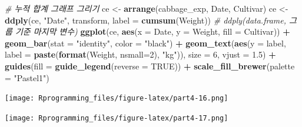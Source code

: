 \documentclass[10pt,]{krantz}
\makeatletter
\newenvironment{Shaded}{\begin{snugshade}}{\end{snugshade}}
\newcommand{\KeywordTok}[1]{\textcolor[rgb]{0.13,0.29,0.53}{\textbf{#1}}}
\newcommand{\DataTypeTok}[1]{\textcolor[rgb]{0.13,0.29,0.53}{#1}}
\newcommand{\DecValTok}[1]{\textcolor[rgb]{0.00,0.00,0.81}{#1}}
\newcommand{\FloatTok}[1]{\textcolor[rgb]{0.00,0.00,0.81}{#1}}
\newcommand{\StringTok}[1]{\textcolor[rgb]{0.31,0.60,0.02}{#1}}
\newcommand{\CommentTok}[1]{\textcolor[rgb]{0.56,0.35,0.01}{\textit{#1}}}
\newcommand{\OtherTok}[1]{\textcolor[rgb]{0.56,0.35,0.01}{#1}}
\newcommand{\OperatorTok}[1]{\textcolor[rgb]{0.81,0.36,0.00}{\textbf{#1}}}
\newcommand{\NormalTok}[1]{#1}
\newenvironment{kframe}{%
\medskip{}
\setlength{\fboxsep}{.8em}
 \def\at@end@of@kframe{}%
 \ifinner\ifhmode%
  \def\at@end@of@kframe{\end{minipage}}%
  \begin{minipage}{\columnwidth}%
 \fi\fi%
 \def\FrameCommand##1{\hskip\@totalleftmargin \hskip-\fboxsep
 \colorbox{shadecolor}{##1}\hskip-\fboxsep
     \hskip-\linewidth \hskip-\@totalleftmargin \hskip\columnwidth}%
 \MakeFramed {\advance\hsize-\width
   \@totalleftmargin\z@ \linewidth\hsize
   \@setminipage}}%
 {\par\unskip\endMakeFramed%
 \at@end@of@kframe}
\renewenvironment{Shaded}{\begin{kframe}}{\end{kframe}}
\theoremstyle{definition}
\theoremstyle{definition}
\theoremstyle{remark}
\makeatother
\begin{document}
\begin{Shaded}
\begin{Highlighting}[]


\CommentTok{# 누적 합계 그래프 그리기}
\NormalTok{ce <-}\StringTok{ }\KeywordTok{arrange}\NormalTok{(cabbage_exp, Date, Cultivar)}
\NormalTok{ce <-}\StringTok{ }\KeywordTok{ddply}\NormalTok{(ce, }\StringTok{"Date"}\NormalTok{, transform, }\DataTypeTok{label =} \KeywordTok{cumsum}\NormalTok{(Weight))}
\CommentTok{# ddply(data.frame, 그룹 기준 마지막 변수)}
\KeywordTok{ggplot}\NormalTok{(ce, }\KeywordTok{aes}\NormalTok{(}\DataTypeTok{x =}\NormalTok{ Date, }\DataTypeTok{y =}\NormalTok{ Weight, }\DataTypeTok{fill =}\NormalTok{ Cultivar)) }\OperatorTok{+}\StringTok{ }\KeywordTok{geom_bar}\NormalTok{(}\DataTypeTok{stat =} \StringTok{"identity"}\NormalTok{, }\DataTypeTok{color =} \StringTok{"black"}\NormalTok{) }\OperatorTok{+}\StringTok{ }
\StringTok{  }\KeywordTok{geom_text}\NormalTok{(}\KeywordTok{aes}\NormalTok{(}\DataTypeTok{y =}\NormalTok{ label, }\DataTypeTok{label =} \KeywordTok{paste}\NormalTok{(}\KeywordTok{format}\NormalTok{(Weight, }\DataTypeTok{nsmall=}\DecValTok{2}\NormalTok{), }\StringTok{"kg"}\NormalTok{)), }\DataTypeTok{size =} \DecValTok{6}\NormalTok{, }\DataTypeTok{vjust =} \FloatTok{1.5}\NormalTok{) }\OperatorTok{+}\StringTok{ }
\StringTok{  }\KeywordTok{guides}\NormalTok{(}\DataTypeTok{fill =} \KeywordTok{guide_legend}\NormalTok{(}\DataTypeTok{reverse =} \OtherTok{TRUE}\NormalTok{)) }\OperatorTok{+}\StringTok{ }\KeywordTok{scale_fill_brewer}\NormalTok{(}\DataTypeTok{palette =} \StringTok{"Pastel1"}\NormalTok{)}
\end{Highlighting}
\end{Shaded}

\texttt{[image: Rprogramming\_files/figure-latex/part4-16.png]}

\begin{Shaded}
\end{Shaded}

\texttt{[image: Rprogramming\_files/figure-latex/part4-17.png]}

\begin{Shaded}
\end{Shaded}
\end{document}
